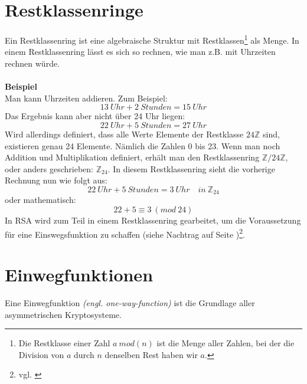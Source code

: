 \section{Restklassenringe}
\label{sec:Restklassenringe}
Ein Restklassenring ist eine algebraische Struktur mit Restklassen\footnote{Die Restklasse einer Zahl $a~mod(n)$ ist die Menge aller Zahlen, bei der die Division von $a$ durch $n$ denselben Rest haben wir $a$.} als Menge.
In einem Restklassenring lässt es sich so rechnen, wie man z.B. mit Uhrzeiten rechnen würde.\\
\\
\textbf{Beispiel}\\
Man kann Uhrzeiten addieren. Zum Beispiel:
\begin{equation*}
13~Uhr + 2~Stunden = 15~Uhr
\end{equation*}
Das Ergebnis kann aber nicht über 24 Uhr liegen:
\begin{equation*}
22~Uhr + 5~Stunden = 27~Uhr
\end{equation*}
Wird allerdings definiert, dass alle Werte Elemente der Restklasse $24\mathbb{Z}$ sind, existieren genau 24 Elemente. Nämlich die Zahlen 0 bis 23. Wenn man noch Addition und Multiplikation definiert, erhält man den Restklassenring $\mathbb{Z}/24\mathbb{Z}$, oder anders geschrieben: $\mathbb{Z}_{24}$.
In diesem Restklassenring sieht die vorherige Rechnung nun wie folgt aus:
\begin{equation*}
22~Uhr + 5~Stunden = 3~Uhr\quad in~\mathbb{Z}_{24}
\end{equation*}
oder mathematisch:
\begin{equation*}
22+5 \equiv 3~(mod~24)
\end{equation*}
In RSA wird zum Teil in einem Restklassenring gearbeitet, um die Voraussetzung für eine Einswegsfunktion zu schaffen (siehe Nachtrag auf Seite \pageref{sec:Nachtrag})\footnote{vgl. \cite{restklassenring}}.
\section{Einwegfunktionen}
\label{sec:Einwegfunktionen}
Eine Einwegfunktion \textit{(engl. one-way-function)} ist die Grundlage aller asymmetrischen Kryptosysteme.

